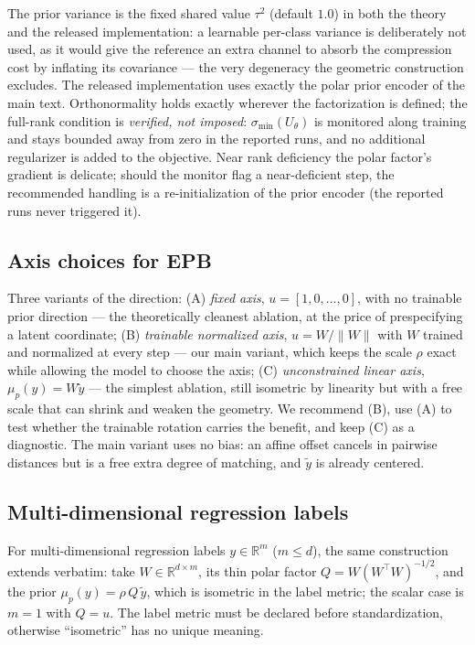 \documentclass{article}
\theoremstyle{plain}
\theoremstyle{remark}
\newcommand{\R}{\mathbb{R}}
\begin{document}
The prior variance is the fixed shared value $\tau^2$ (default $1.0$) in both the
theory and the released implementation: a learnable per-class variance is
deliberately not used, as it would give the reference an extra channel to absorb the
compression cost by inflating its covariance --- the very degeneracy the geometric
construction excludes. The released implementation uses exactly the polar prior
encoder of the main text. Orthonormality holds exactly wherever the factorization is
defined; the full-rank condition is \emph{verified, not imposed}: $\sigma_{\min}(U_\theta)$
is monitored along training and stays bounded away from zero in the reported runs,
and no additional regularizer is added to the objective. Near rank deficiency the
polar factor's gradient is delicate; should the monitor flag a near-deficient step,
the recommended handling is a re-initialization of the prior encoder (the reported
runs never triggered it).

\subsection{Axis choices for EPB}

Three variants of the direction: (A) \emph{fixed axis}, $u = [1, 0, \dots, 0]$, with
no trainable prior direction --- the theoretically cleanest ablation, at the price of
prespecifying a latent coordinate; (B) \emph{trainable normalized axis},
$u = W/\|W\|$ with $W$ trained and normalized at every step --- our main variant,
which keeps the scale $\rho$ exact while allowing the model to choose the axis;
(C) \emph{unconstrained linear axis}, $\mu_p(y) = W \tilde y$ --- the simplest
ablation, still isometric by linearity but with a free scale that can shrink and
weaken the geometry. We recommend (B), use (A) to test whether the trainable
rotation carries the benefit, and keep (C) as a diagnostic. The main variant uses no
bias: an affine offset cancels in pairwise distances but is a free extra degree of
matching, and $\tilde y$ is already centered.

\subsection{Multi-dimensional regression labels}

For multi-dimensional regression labels $y \in \R^m$ ($m \le d$), the same
construction extends verbatim: take $W \in \R^{d \times m}$, its thin polar factor
$Q = W (W^{\top}W)^{-1/2}$, and the prior $\mu_p(y) = \rho\, Q\, \tilde y$, which is
isometric in the label metric; the scalar case is $m = 1$ with $Q = u$. The label
metric must be declared before standardization, otherwise ``isometric'' has no unique
meaning.
\end{document}
